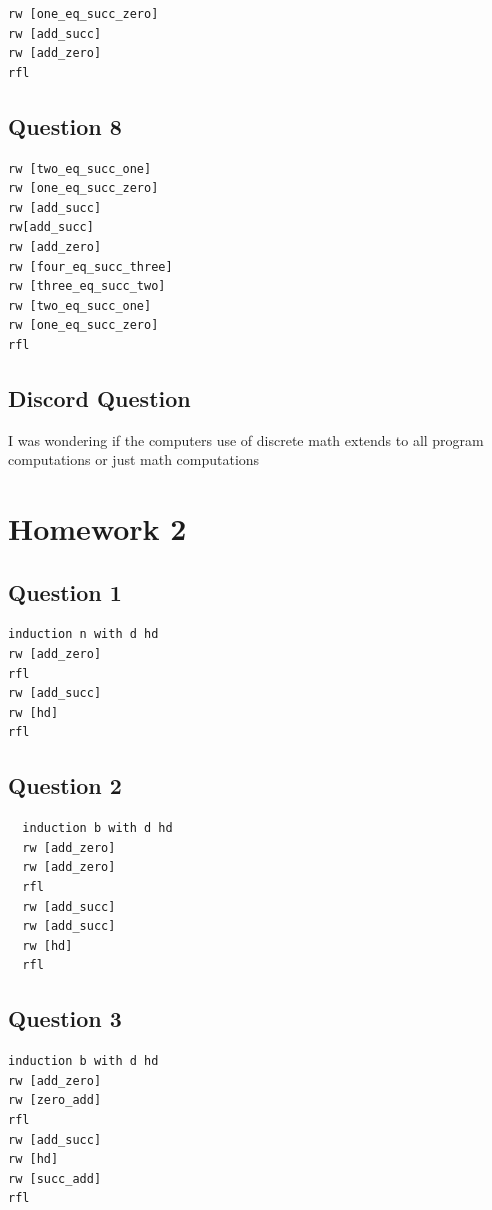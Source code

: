 \documentclass{article}
\theoremstyle{plain}
\theoremstyle{definition}
\theoremstyle{remark}
\begin{document}
\begin{lstlisting}
rw [one_eq_succ_zero]
rw [add_succ]
rw [add_zero]
rfl
\end{lstlisting}


\subsection{Question 8}

\begin{lstlisting}
rw [two_eq_succ_one]
rw [one_eq_succ_zero]
rw [add_succ]
rw[add_succ]
rw [add_zero]
rw [four_eq_succ_three]
rw [three_eq_succ_two]
rw [two_eq_succ_one]
rw [one_eq_succ_zero]
rfl
\end{lstlisting}

\subsection{Discord Question}

I was wondering if the computers use of discrete math extends to all program computations or just math computations

\section{Homework 2}\label{homework2}

\subsection{Question 1}

\begin{lstlisting}
induction n with d hd
rw [add_zero]
rfl
rw [add_succ]
rw [hd]
rfl
\end{lstlisting}

\subsection{Question 2}

\begin{lstlisting}
  induction b with d hd
  rw [add_zero]
  rw [add_zero]
  rfl
  rw [add_succ]
  rw [add_succ]
  rw [hd]
  rfl
\end{lstlisting}

\subsection{Question 3}

\begin{lstlisting}
induction b with d hd
rw [add_zero]
rw [zero_add]
rfl
rw [add_succ]
rw [hd]
rw [succ_add]
rfl
\end{lstlisting}
\end{document}
